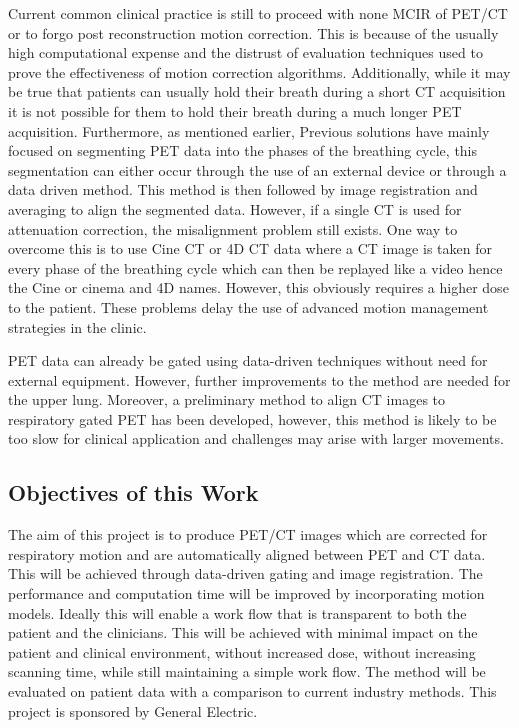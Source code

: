         Current common clinical practice is still to proceed with none \gls{MCIR} of \gls{PET}/\gls{CT} or to forgo post reconstruction motion correction. This is because of the usually high computational expense and the distrust of evaluation techniques used to prove the effectiveness of motion correction algorithms. Additionally, while it may be true that patients can usually hold their breath during a short \gls{CT} acquisition it is not possible for them to hold their breath during a much longer \gls{PET} acquisition. Furthermore, as mentioned earlier, Previous solutions have mainly focused on segmenting PET data into the phases of the breathing cycle, this segmentation can either occur through the use of an external device or through a data driven method. This method is then followed by image registration and averaging to align the segmented data. However, if a single CT is used for attenuation correction, the misalignment problem still exists. One way to overcome this is to use Cine CT or 4D CT data where a CT image is taken for every phase of the breathing cycle which can then be replayed like a video hence the Cine or cinema and 4D names. However, this obviously requires a higher dose to the patient. These problems delay the use of advanced motion management strategies in the clinic.
        
        PET data can already be gated using data-driven techniques without need for external equipment. However, further improvements to the method are needed for the upper lung. Moreover, a preliminary method to align CT images to respiratory gated PET has been developed, however, this method is likely to be too slow for clinical application and challenges may arise with larger movements.
        
        \subsection{Objectives of this Work} \label{objectives_of_this_work}
            The aim of this project is to produce PET/CT images which are corrected for respiratory motion and are automatically aligned between PET and CT data. This will be achieved through data-driven gating and image registration. The performance and computation time will be improved by incorporating motion models. Ideally this will enable a work flow that is transparent to both the patient and the clinicians. This will be achieved with minimal impact on the patient and clinical environment, without increased dose, without increasing scanning time, while still maintaining a simple work flow. The method will be evaluated on patient data with a comparison to current industry methods. This project is sponsored by General Electric.
    
        \blindtext
